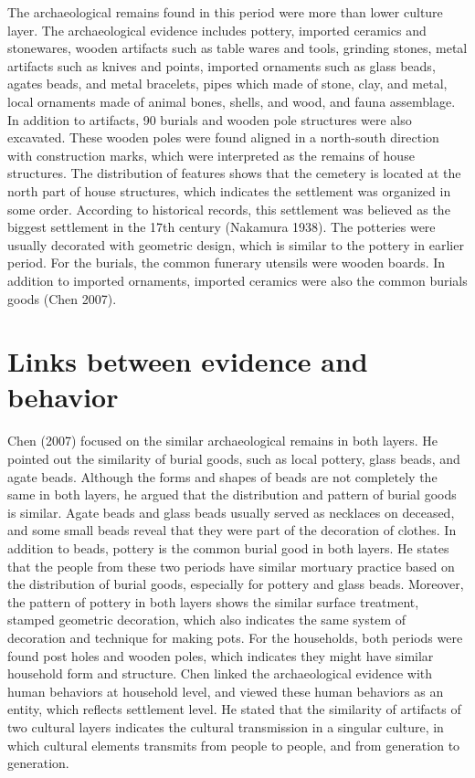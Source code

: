 \documentclass[10pt]{article}
\begin{document}
The archaeological remains found in this period were more than lower
culture layer. The archaeological evidence includes pottery, imported
ceramics and stonewares, wooden artifacts such as table wares and tools,
grinding stones, metal artifacts such as knives and points, imported
ornaments such as glass beads, agates beads, and metal bracelets, pipes
which made of stone, clay, and metal, local ornaments made of animal
bones, shells, and wood, and fauna assemblage. In addition to artifacts,
90 burials and wooden pole structures were also excavated. These wooden
poles were found aligned in a north-south direction with construction
marks, which were interpreted as the remains of house structures. The
distribution of features shows that the cemetery is located at the north
part of house structures, which indicates the settlement was organized
in some order. According to historical records, this settlement was
believed as the biggest settlement in the 17th century (Nakamura 1938).
The potteries were usually decorated with geometric design, which is
similar to the pottery in earlier period. For the burials, the common
funerary utensils were wooden boards. In addition to imported ornaments,
imported ceramics were also the common burials goods (Chen 2007).

\section*{Links between evidence and
behavior}\label{links-between-evidence-and-behavior}

Chen (2007) focused on the similar archaeological remains in both
layers. He pointed out the similarity of burial goods, such as local
pottery, glass beads, and agate beads. Although the forms and shapes of
beads are not completely the same in both layers, he argued that the
distribution and pattern of burial goods is similar. Agate beads and
glass beads usually served as necklaces on deceased, and some small
beads reveal that they were part of the decoration of clothes. In
addition to beads, pottery is the common burial good in both layers. He
states that the people from these two periods have similar mortuary
practice based on the distribution of burial goods, especially for
pottery and glass beads. Moreover, the pattern of pottery in both layers
shows the similar surface treatment, stamped geometric decoration, which
also indicates the same system of decoration and technique for making
pots. For the households, both periods were found post holes and wooden
poles, which indicates they might have similar household form and
structure. Chen linked the archaeological evidence with human behaviors
at household level, and viewed these human behaviors as an entity, which
reflects settlement level. He stated that the similarity of artifacts of
two cultural layers indicates the cultural transmission in a singular
culture, in which cultural elements transmits from people to people, and
from generation to generation.
\end{document}
